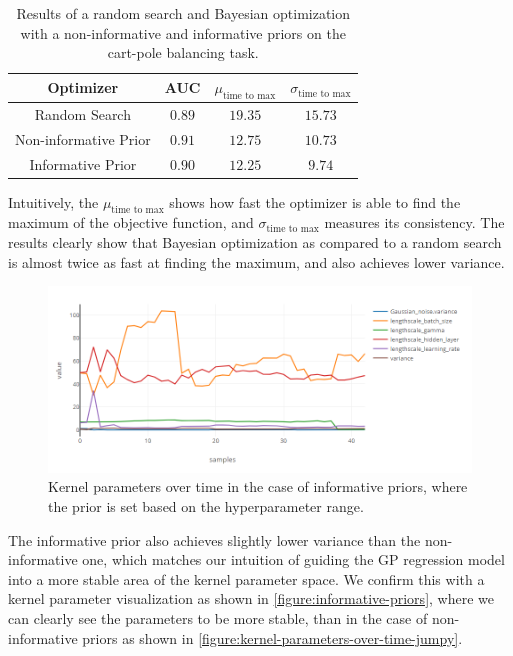 \begin{table}[t]
	\begin{center}
		\begin{tabular}{||c c c c||} 
			\hline
			Optimizer & AUC & $\mu_{\text{time to max}}$ & $\sigma_{\text{time to max}}$ \\ [0.5ex] 
			\hline\hline
			Random Search & $0.89$ & $19.35$ & $15.73$ \\ 
			\hline
			Non-informative Prior & $0.91$ & $12.75$ & $10.73$ \\
			\hline
			Informative Prior & $0.90$ & $12.25$ & $9.74$  \\
			\hline
		\end{tabular}
		\caption{Results of a random search and Bayesian optimization with a non-informative and informative priors on the cart-pole balancing task.}
		\label{table:reinforce-results}
	\end{center}
\end{table}

Intuitively, the $\mu_{\text{time to max}}$ shows how fast the optimizer is able to find the maximum of the objective function, and $\sigma_{\text{time to max}}$ measures its consistency. The results clearly show that Bayesian optimization as compared to a random search is almost twice as fast at finding the maximum, and also achieves lower variance.

\begin{figure}
	\begin{center}
		\includegraphics[width=1.0\textwidth]{images/informative-priors.png}
		\caption{Kernel parameters over time in the case of informative priors, where the prior is set based on the hyperparameter range.}
		\label{figure:informative-priors}
	\end{center}
\end{figure}


The informative prior also achieves slightly lower variance than the non-informative one, which matches our intuition of guiding the GP regression model into a more stable area of the kernel parameter space. We confirm this with a kernel parameter visualization as shown in \autoref{figure:informative-priors}, where we can clearly see the parameters to be more stable, than in the case of non-informative priors as shown in \autoref{figure:kernel-parameters-over-time-jumpy}.

